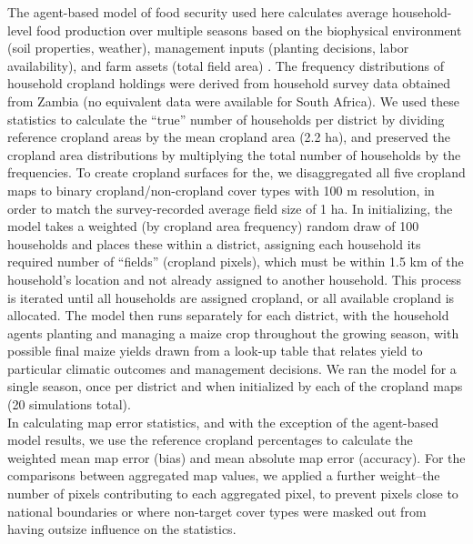 \documentclass{pnastwo}
\begin{document}
\begin{article}
\begin{materials}
\indent The agent-based model of food security used here calculates average household-level food production over multiple seasons based on the biophysical environment (soil properties, weather), management inputs (planting decisions, labor availability), and farm assets (total field area) \cite{chen_dependency_2013}. The frequency distributions of household cropland holdings were derived from household survey data obtained from Zambia (no equivalent data were available for South Africa). We used these statistics to calculate the ``true'' number of households per district by dividing reference cropland areas by the mean cropland area (2.2 ha), and preserved the cropland area distributions by multiplying the total number of households by the frequencies. To create cropland surfaces for the, we disaggregated all five cropland maps to binary cropland/non-cropland cover types with 100 m resolution, in order to match the survey-recorded average field size of 1 ha. In initializing, the model takes a weighted (by cropland area frequency) random draw of 100 households and places these within a district, assigning each household its required number of ``fields'' (cropland pixels), which must be within 1.5 km of the household's location and not already assigned to another household. This process is iterated until all households are assigned cropland, or all available cropland is allocated. The model then runs separately for each district, with the household agents planting and managing a maize crop throughout the growing season, with possible final maize yields drawn from a look-up table that relates yield to particular climatic outcomes and management decisions. We ran the model for a single season, once per district and when initialized by each of the cropland maps (20 simulations total).  \\
\indent In calculating map error statistics, and with the exception of the agent-based model results, we use the reference cropland percentages to calculate the weighted mean map error (bias) and mean absolute map error (accuracy). For the comparisons between aggregated map values, we applied a further weight--the number of pixels contributing to each aggregated pixel, to prevent pixels close to national boundaries or where non-target cover types were masked out from having outsize influence on the statistics. 



\end{materials}
\end{article}
\end{document}
